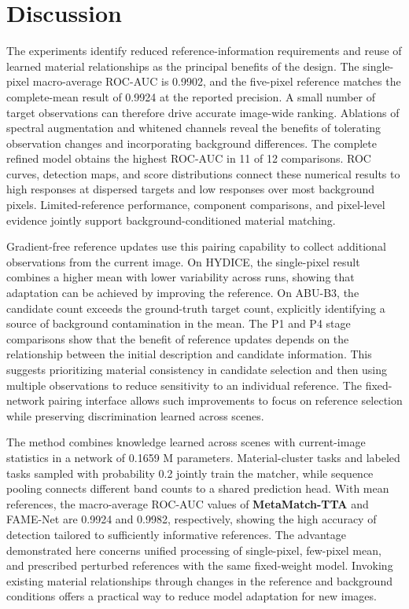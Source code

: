 \documentclass[a4paper,11pt]{article}
\newcommand{\method}{\textbf{MetaMatch-TTA}}
\begin{document}
\FloatBarrier

\section{Discussion}
The experiments identify reduced reference-information requirements and reuse of learned material relationships as the principal benefits of the design. The single-pixel macro-average ROC-AUC is 0.9902, and the five-pixel reference matches the complete-mean result of 0.9924 at the reported precision. A small number of target observations can therefore drive accurate image-wide ranking. Ablations of spectral augmentation and whitened channels reveal the benefits of tolerating observation changes and incorporating background differences. The complete refined model obtains the highest ROC-AUC in 11 of 12 comparisons. ROC curves, detection maps, and score distributions connect these numerical results to high responses at dispersed targets and low responses over most background pixels. Limited-reference performance, component comparisons, and pixel-level evidence jointly support background-conditioned material matching.

Gradient-free reference updates use this pairing capability to collect additional observations from the current image. On HYDICE, the single-pixel result combines a higher mean with lower variability across runs, showing that adaptation can be achieved by improving the reference. On ABU-B3, the candidate count exceeds the ground-truth target count, explicitly identifying a source of background contamination in the mean. The P1 and P4 stage comparisons show that the benefit of reference updates depends on the relationship between the initial description and candidate information. This suggests prioritizing material consistency in candidate selection and then using multiple observations to reduce sensitivity to an individual reference. The fixed-network pairing interface allows such improvements to focus on reference selection while preserving discrimination learned across scenes.

The method combines knowledge learned across scenes with current-image statistics in a network of 0.1659 M parameters. Material-cluster tasks and labeled tasks sampled with probability 0.2 jointly train the matcher, while sequence pooling connects different band counts to a shared prediction head. With mean references, the macro-average ROC-AUC values of \method{} and FAME-Net are 0.9924 and 0.9982, respectively, showing the high accuracy of detection tailored to sufficiently informative references. The advantage demonstrated here concerns unified processing of single-pixel, few-pixel mean, and prescribed perturbed references with the same fixed-weight model. Invoking existing material relationships through changes in the reference and background conditions offers a practical way to reduce model adaptation for new images.
\end{document}

